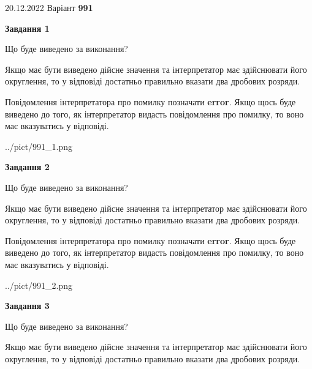 \documentclass[12pt, ukrainian]{article}
\begin{document}
{20.12.2022 Варіант \No \textbf { 991 }\par}
{
\begin {Large}

{\begin {center}\textbf{Завдання 1}\end {center}}\par
Що буде виведено за виконання? \par

Якщо має бути виведено дійсне значення та інтерпретатор має здійснювати його округлення, 
то у відповіді достатньо правильно вказати два дробових розряди.

Повідомлення інтерпретатора про помилку позначати \textbf{error}.
Якщо щось буде виведено до того, як інтерпретатор видасть повідомлення про помилку, 
то воно має вказуватись у відповіді. \par

\begin{center}
	{../pict/991_1.png}
\end{center}
\newpage

{\begin {center}\textbf{Завдання 2}\end {center}}\par
Що буде виведено за виконання? \par

Якщо має бути виведено дійсне значення та інтерпретатор має здійснювати його округлення, 
то у відповіді достатньо правильно вказати два дробових розряди.

Повідомлення інтерпретатора про помилку позначати \textbf{error}.
Якщо щось буде виведено до того, як інтерпретатор видасть повідомлення про помилку, 
то воно має вказуватись у відповіді. \par

\begin{center}
	{../pict/991_2.png}
\end{center}
\newpage

{\begin {center}\textbf{Завдання 3}\end {center}}\par
Що буде виведено за виконання? \par

Якщо має бути виведено дійсне значення та інтерпретатор має здійснювати його округлення, 
то у відповіді достатньо правильно вказати два дробових розряди.


\end{Large}}
\end{document}
